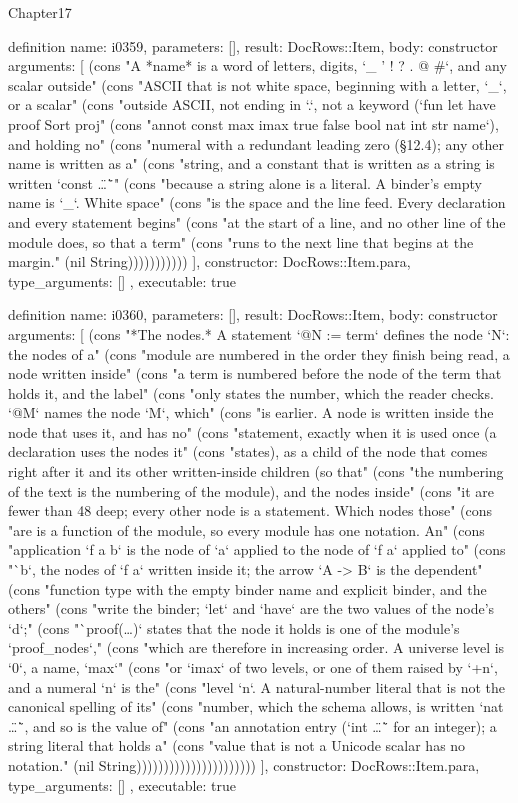 \begin{lexlean}{Chapter17}
\begin{semanticmodule}
definition{
  name: i0359,
  parameters: [],
  result: DocRows::Item,
  body: constructor{
    arguments: [
      (cons "A *name* is a word of letters, digits, `_ ' ! ? . @ #`, and any scalar outside" (cons "ASCII that is not white space, beginning with a letter, `_`, or a scalar" (cons "outside ASCII, not ending in `.`, not a keyword (`fun let have proof Sort proj" (cons "annot const max imax true false bool nat int str name`), and holding no" (cons "numeral with a redundant leading zero (§12.4); any other name is written as a" (cons "string, and a constant that is written as a string is written `const \"…\"`" (cons "because a string alone is a literal. A binder's empty name is `_`. White space" (cons "is the space and the line feed. Every declaration and every statement begins" (cons "at the start of a line, and no other line of the module does, so that a term" (cons "runs to the next line that begins at the margin." (nil String)))))))))))
    ],
    constructor: DocRows::Item.para,
    type_arguments: []
  },
  executable: true
}

definition{
  name: i0360,
  parameters: [],
  result: DocRows::Item,
  body: constructor{
    arguments: [
      (cons "*The nodes.* A statement `@N := term` defines the node `N`: the nodes of a" (cons "module are numbered in the order they finish being read, a node written inside" (cons "a term is numbered before the node of the term that holds it, and the label" (cons "only states the number, which the reader checks. `@M` names the node `M`, which" (cons "is earlier. A node is written inside the node that uses it, and has no" (cons "statement, exactly when it is used once (a declaration uses the nodes it" (cons "states), as a child of the node that comes right after it and its other written-inside children (so that" (cons "the numbering of the text is the numbering of the module), and the nodes inside" (cons "it are fewer than 48 deep; every other node is a statement. Which nodes those" (cons "are is a function of the module, so every module has one notation. An" (cons "application `f a b` is the node of `a` applied to the node of `f a` applied to" (cons "`b`, the nodes of `f a` written inside it; the arrow `A -> B` is the dependent" (cons "function type with the empty binder name and explicit binder, and the others" (cons "write the binder; `let` and `have` are the two values of the node's `d`;" (cons "`proof(…)` states that the node it holds is one of the module's `proof_nodes`," (cons "which are therefore in increasing order. A universe level is `0`, a name, `max`" (cons "or `imax` of two levels, or one of them raised by `+n`, and a numeral `n` is the" (cons "level `n`. A natural-number literal that is not the canonical spelling of its" (cons "number, which the schema allows, is written `nat \"…\"`, and so is the value of" (cons "an annotation entry (`int \"…\"` for an integer); a string literal that holds a" (cons "value that is not a Unicode scalar has no notation." (nil String))))))))))))))))))))))
    ],
    constructor: DocRows::Item.para,
    type_arguments: []
  },
  executable: true
}


\end{semanticmodule}
\end{lexlean}
